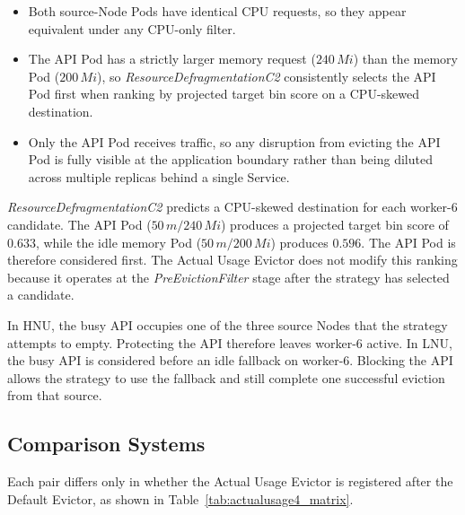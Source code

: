 \begin{itemize}
    \item Both source-Node Pods have identical CPU requests, so they appear equivalent under any CPU-only filter.
    \item The API Pod has a strictly larger memory request (\(240\,Mi\)) than the memory Pod (\(200\,Mi\)), so \textit{ResourceDefragmentationC2} consistently selects the API Pod first when ranking by projected target bin score on a CPU-skewed destination.
    \item Only the API Pod receives traffic, so any disruption from evicting the API Pod is fully visible at the application boundary rather than being diluted across multiple replicas behind a single Service.
\end{itemize}

\textit{ResourceDefragmentationC2} predicts a CPU-skewed destination for each worker-6 candidate. The API Pod (\(50\,m/240\,Mi\)) produces a projected target bin score of \(0.633\), while the idle memory Pod (\(50\,m/200\,Mi\)) produces \(0.596\). The API Pod is therefore considered first. The Actual Usage Evictor does not modify this ranking because it operates at the \textit{PreEvictionFilter} stage after the strategy has selected a candidate.

In HNU, the busy API occupies one of the three source Nodes that the strategy attempts to empty. Protecting the API therefore leaves worker-6 active. In LNU, the busy API is considered before an idle fallback on worker-6. Blocking the API allows the strategy to use the fallback and still complete one successful eviction from that source.

\subsection{Comparison Systems}
\label{subsec:actualusage4_scenario}
Each pair differs only in whether the Actual Usage Evictor is registered after the Default Evictor, as shown in Table~\ref{tab:actualusage4_matrix}.

